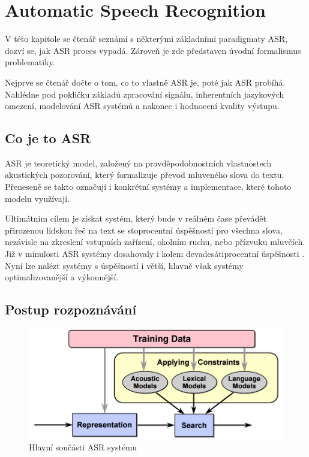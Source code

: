 \chapter{Automatic Speech Recognition}

V této kapitole se čtenář seznámí s některými základními paradigmaty ASR, dozví se, jak ASR proces vypadá. Zároveň je zde představen úvodní formalismus problematiky.

Nejprve se čtenář dočte o tom, co to vlastně ASR je, poté jak ASR probíhá. Nahlédne pod pokličku základů zpracování signálu, inherentních jazykových omezení, modelování ASR systémů a nakonec i hodnocení kvality výstupu.

\section{Co je to ASR}

ASR je teoretický model, založený na pravděpodobnostních vlastnostech akustických pozorování, který formalizuje převod mluveného slova do textu. Přeneseně se takto označují i konkrétní systémy a implementace, které tohoto modelu využívají. 

Ultimátním cílem  je získat systém, který bude v reálném čase převádět přirozenou lidskou řeč na text se stoprocentní úspěšností pro všechna slova, nezávisle na zkreslení vstupních zařízení, okolním ruchu, nebo přízvuku mluvčích. Již v minulosti ASR systémy dosahovaly i kolem devadesátiprocentní úspěšnosti \cite{jelinek_1976}. Nyní lze nalézt systémy s úspěšností i větší, hlavně však systémy optimalizovanější a výkonnější.

\section{Postup rozpoznávání}

\begin{figure}[h]
	\centering
	\includegraphics[width=140mm]{img/asr_process.png}
	\caption{Hlavní součásti ASR systému \cite{mit_asr_2003}}
	\label{fig:asr_process}
\end{figure}

